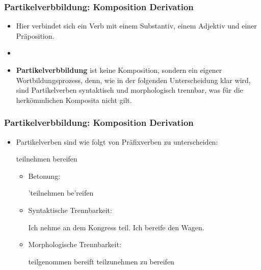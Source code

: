 
\begin{frame}
\frametitle{Partikelverbbildung: Komposition \vs Derivation}

\begin{itemize}
	\item Hier verbindet sich ein Verb mit einem Substantiv, einem Adjektiv und einer Präposition.
	\item[]
	\item \textbf{Partikelverbbildung} ist keine Komposition, sondern ein eigener Wortbildungsprozess, denn, wie in der folgenden Unterscheidung klar wird, sind Partikelverben syntaktisch und morphologisch trennbar, was für die herkömmlichen Komposita nicht gilt.
\end{itemize}


\end{frame}




\begin{frame}
\frametitle{Partikelverbbildung: Komposition \vs Derivation}

\begin{itemize}
	\item Partikelverben sind wie folgt von Präfixverben zu unterscheiden:
	
	\ea  teilnehmen \vs bereifen
	\z
	
	\begin{itemize}
		\item Betonung:
		
		\ea 'teilnehmen \vs be'reifen
		\z
		
		\item Syntaktische Trennbarkeit:
		
		\eal
		\ex Ich nehme an dem Kongress teil.
		\ex[]\vs
		\ex Ich bereife den Wagen.
		\zl
			
		\item Morphologische Trennbarkeit:
		
		\eal 
		\ex teilgenommen \vs bereift 
		\ex teilzunehmen \vs zu bereifen 
		\zl
		
	\end{itemize}
	
\end{itemize}

\end{frame}



